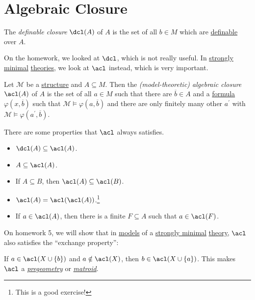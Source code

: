 \section{Algebraic Closure}
\begin{prev}
	The \emph{definable closure} \(\dcl(A) \) of \(A\) is the set of all \(b\in M\) which are \hyperref[def:definable]{definable} over \(A\).
\end{prev}

On the homework, we looked at \(\dcl\), which is not really useful. In \hyperref[def:strongly-minimal]{strongly minimal} \hyperref[def:theory]{theories}, we look at \(\acl \) instead, which is very important.

\begin{definition}\label{def:model-algebraic-closure}
	Let \(\mathcal{M} \) be a \hyperref[def:structure]{structure} and \(A \subseteq M\). Then the \emph{(model-theoretic) algebraic closure} \(\acl(A) \) of \(A\) is the set of all \(a\in M\) such that there are \(\overline{b} \in A\) and a \hyperref[def:formula]{formula} \(\varphi (x, \overline{b} )\) such that \(\mathcal{M} \models \varphi (a, \overline{b} )\) and there are only finitely many other \(a^{\prime} \) with \(\mathcal{M} \models \varphi (a^{\prime} , \overline{b} )\).
\end{definition}

\begin{note}
	There are some properties that \(\acl \) always satisfies.
	\begin{itemize}
		\item \(\dcl(A) \subseteq \acl(A) \).
		\item \(A \subseteq \acl(A) \).
		\item If \(A \subseteq B\), then \(\acl(A) \subseteq \acl(B) \).
		\item \(\acl(A) = \acl(\acl(A)) \).\footnote{This is a good exercise!}
		\item If \(a\in \acl(A) \), then there is a finite \(F \subseteq A\) such that \(a\in \acl(F) \).
	\end{itemize}
\end{note}

On homework 5, we will show that in \hyperref[def:model]{models} of a \hyperref[def:strongly-minimal]{strongly minimal} \hyperref[def:theory]{theory}, \(\acl\) also satisfies the ``exchange property'':

\begin{remark}
	If \(a\in \acl(X \cup \left\{ b \right\}) \) and \(a \notin \acl(X) \), then \(b\in \acl(X \cup \left\{ a \right\}) \). This makes \(\acl \) a \href{https://en.wikipedia.org/wiki/Pregeometry_(model_theory)}{\emph{pregeometry}} or \href{https://en.wikipedia.org/wiki/Matroid}{\emph{matroid}}.
\end{remark}

